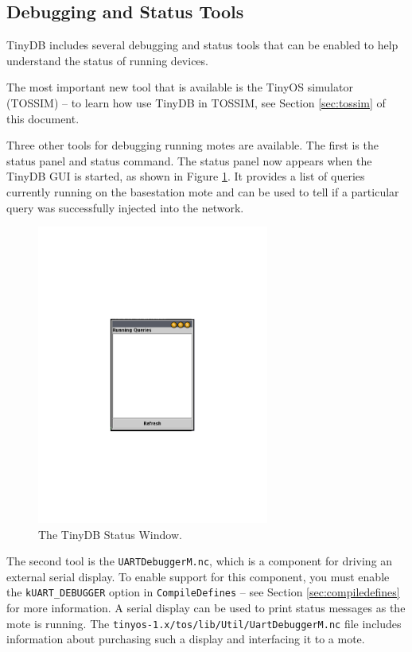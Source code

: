 \documentclass[11pt]{article}
\newcommand{\docroot}{tinyos-1.x}
\begin{document}
\subsection{Debugging and Status Tools}

TinyDB includes several debugging and status tools that can be enabled
to help understand the status of running devices.

The most important new tool that is available is the TinyOS simulator
(TOSSIM) -- to learn how use TinyDB in TOSSIM, see Section
\ref{sec:tossim} of this document.

Three other tools for debugging running motes are available.  The first is the 
status panel and status command.  The status panel now appears when the TinyDB
GUI is started, as shown in Figure \ref{fig:status-panel}.  It provides a list
of queries currently running on the basestation mote and can be used to tell
if a particular query was successfully injected into the network.

\begin{figure}
\centering\includegraphics[width=3in]{status}
\caption{The TinyDB Status Window.}\label{fig:status-panel}
\end{figure}

The second tool is the {\tt UARTDebuggerM.nc}, which is a component for driving an
external serial display.  To enable support for this component, you must enable
the {\tt kUART\_DEBUGGER} option in {\tt CompileDefines} -- see Section \ref{sec:compiledefines}
for more information.  A serial display can be used to print status messages as 
the mote is running.  The {\tt \docroot/tos/lib/Util/UartDebuggerM.nc} file
includes information about purchasing such a display and interfacing it to a
mote.
\end{document}
